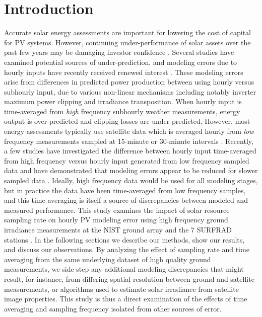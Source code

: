 \documentclass[conference]{IEEEtran}
\begin{document}
\section{Introduction}
Accurate solar energy assessments are important for lowering the cost of capital for PV systems. However, continuing under-performance of solar assets over the past few years may be damaging investor confidence \cite{Matsui2021}. Several studies have examined potential sources of under-prediction, and modeling errors due to hourly inputs have recently received renewed interest \cite{Parikh2021,Anderson2020,Bradford2020,Kharait2020,Cormode2019}. These modeling errors arise from differences in predicted power production between using hourly versus subhourly input, due to various non-linear mechanisms including notably inverter maximum power clipping and irradiance transposition. When hourly input is time-averaged from \emph{high} frequency subhourly weather measurements, energy output is over-predicted and clipping losses are under-predicted. However, most energy assessments typically use satellite data which is averaged hourly from \emph{low} frequency measurements sampled at 15-minute or 30-minute intervals \cite{Wilcox2012,Sengupta2018}. Recently, a few studies have investigated the difference between hourly input time-averaged from high frequency versus hourly input generated from low frequency sampled data and have demonstrated that modeling errors appear to be reduced for slower sampled data \cite{Bowersox2021,osti_1797569}. Ideally, high frequency data would be used for all modeling stages, but in practice the data have been time-averaged from low frequency samples, and this time averaging is itself a source of discrepancies between modeled and measured performance. This study examines the impact of solar resource sampling rate on hourly PV modeling error using high frequency ground irradiance measurements at the NIST ground array \cite{Boyd2017,Boyd2017a,Boyd2017b} and the 7 SURFRAD stations \cite{Augustine2000}. In the following sections we describe our methods, show our results, and discuss our observations. By analyzing the effect of sampling rate and time averaging from the same underlying dataset of high quality ground measurements, we side-step any additional modeling discrepancies that might result, for instance, from differing spatial resolution between ground and satellite measurements, or algorithms used to estimate solar irradiance from satellite image properties. This study is thus a direct examination of the effects of time averaging and sampling frequency isolated from other sources of error.
\end{document}
